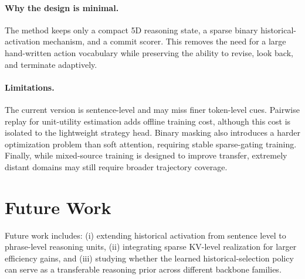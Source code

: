 \documentclass{article}
\begin{document}
\paragraph{Why the design is minimal.}
The method keeps only a compact 5D reasoning state, a sparse binary historical-activation mechanism, and a commit scorer. This removes the need for a large hand-written action vocabulary while preserving the ability to revise, look back, and terminate adaptively.

\paragraph{Limitations.}
The current version is sentence-level and may miss finer token-level cues. Pairwise replay for unit-utility estimation adds offline training cost, although this cost is isolated to the lightweight strategy head. Binary masking also introduces a harder optimization problem than soft attention, requiring stable sparse-gating training. Finally, while mixed-source training is designed to improve transfer, extremely distant domains may still require broader trajectory coverage.

\section{Future Work}
\label{sec:future}
Future work includes: (i) extending historical activation from sentence level to phrase-level reasoning units, (ii) integrating sparse KV-level realization for larger efficiency gains, and (iii) studying whether the learned historical-selection policy can serve as a transferable reasoning prior across different backbone families.



\end{document}
